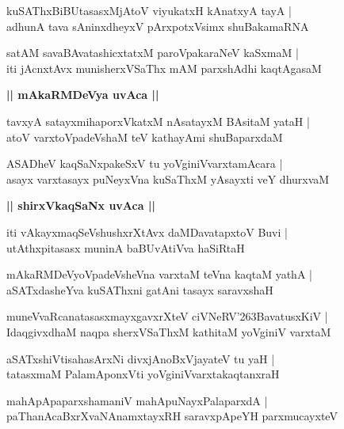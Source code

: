 \documentclass[twoside,12pt,openright]{book}
\def\S{\char'263}
\newcounter{shloka}[chapter]
\def\uvaca#1{\centerline{{\large\textbf{#1}}}}
\begin{document}
\begin{shloka}%
kuSAThxBiBUtasasxMjAtoV viyukatxH kAnatxyA tayA |\\
adhunA tava sAninxdheyxV pArxpotxVsimx shuBakamaRNA 
\end{shloka}

\begin{shloka}%
satAM savaBAvatashicxtatxM paroVpakaraNeV kaSxmaM |\\
iti jAcnxtAvx munisherxVSaThx mAM parxshAdhi kaqtAgasaM
\end{shloka}

\uvaca{|| mAkaRMDeVya uvAca ||}

\begin{shloka}%
tavxyA satayxmihaporxVkatxM nAsatayxM BAsitaM yataH |\\
atoV varxtoVpadeVshaM teV kathayAmi shuBaparxdaM 
\end{shloka}

\begin{shloka}%
ASADheV kaqSaNxpakeSxV tu yoVginiVvarxtamAcara |\\
asayx varxtasayx puNeyxVna kuSaThxM yAsayxti veY dhurxvaM 
\end{shloka}

\uvaca{|| shirxVkaqSaNx uvAca ||}

\begin{shloka}%
iti vAkayxmaqSeVshushxrXtAvx daMDavatapxtoV Buvi |\\
utAthxpitasasx muninA baBUvAtiVva haSiRtaH 
\end{shloka}

\begin{shloka}%
mAkaRMDeVyoVpadeVsheVna varxtaM teVna kaqtaM yathA |\\
aSATxdasheYva kuSAThxni gatAni tasayx saravxshaH
\end{shloka}

\begin{shloka}%
muneVvaRcanatasasxmayxgavxrXteV ciVNeRV\S BavatusxKiV |\\
IdaqgivxdhaM naqpa sherxVSaThxM kathitaM yoVginiV varxtaM
\end{shloka}

\begin{shloka}%
aSATxshiVtisahasArxNi divxjAnoBxVjayateV tu yaH |\\
tatasxmaM PalamAponxVti yoVginiVvarxtakaqtanxraH
\end{shloka}

\begin{shloka}%
mahApApaparxshamaniV mahApuNayxPalaparxdA |\\
paThanAcaBxrXvaNAnamxtayxRH saravxpApeYH parxmucayxteV 
\end{shloka}
\end{document}
